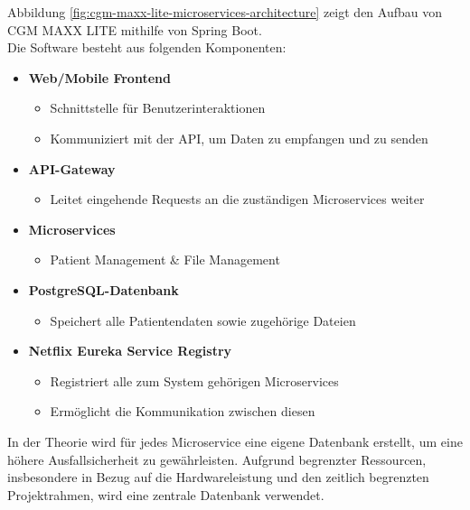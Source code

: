     Abbildung \ref{fig:cgm-maxx-lite-microservices-architecture} zeigt den Aufbau von CGM MAXX LITE mithilfe von Spring Boot. \\
    Die Software besteht aus folgenden Komponenten:
    \begin{itemize}
        \item \textbf{Web/Mobile Frontend}
        \begin{itemize}[label=$\circ$]
            \item Schnittstelle für Benutzerinteraktionen
            \item Kommuniziert mit der API, um Daten zu empfangen und zu senden
        \end{itemize}
        
        \item \textbf{API-Gateway}
        \begin{itemize}[label=$\circ$]
            \item Leitet eingehende Requests an die zuständigen Microservices weiter
        \end{itemize}
        
        \item \textbf{Microservices}
        \begin{itemize}[label=$\circ$]
            \item Patient Management \& File Management
        \end{itemize}

        \item \textbf{PostgreSQL-Datenbank}
        \begin{itemize}[label=$\circ$]
            \item Speichert alle Patientendaten sowie zugehörige Dateien
        \end{itemize}
        
        \item \textbf{Netflix Eureka Service Registry}
        \begin{itemize}[label=$\circ$]
            \item Registriert alle zum System gehörigen Microservices
            \item Ermöglicht die Kommunikation zwischen diesen
        \end{itemize}
    \end{itemize}

    In der Theorie wird für jedes Microservice eine eigene Datenbank erstellt, um eine höhere Ausfallsicherheit zu gewährleisten. 
    Aufgrund begrenzter Ressourcen, insbesondere in Bezug auf die Hardwareleistung und den zeitlich begrenzten Projektrahmen, wird eine zentrale Datenbank verwendet.

